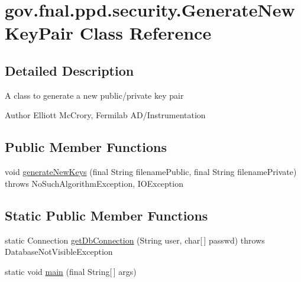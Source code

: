 \hypertarget{classgov_1_1fnal_1_1ppd_1_1security_1_1GenerateNewKeyPair}{\section{gov.\-fnal.\-ppd.\-security.\-Generate\-New\-Key\-Pair Class Reference}
\label{classgov_1_1fnal_1_1ppd_1_1security_1_1GenerateNewKeyPair}
}


\subsection{Detailed Description}
A class to generate a new public/private key pair 

\begin{DoxyAuthor}{Author}
Elliott Mc\-Crory, Fermilab A\-D/\-Instrumentation 
\end{DoxyAuthor}
\subsection*{Public Member Functions}
\begin{DoxyCompactItemize}
\item 
void \hyperlink{classgov_1_1fnal_1_1ppd_1_1security_1_1GenerateNewKeyPair_a8fd10e2d562feed30edd515a65c65935}{generate\-New\-Keys} (final String filename\-Public, final String filename\-Private)  throws No\-Such\-Algorithm\-Exception, I\-O\-Exception 
\end{DoxyCompactItemize}
\subsection*{Static Public Member Functions}
\begin{DoxyCompactItemize}
\item 
static Connection \hyperlink{classgov_1_1fnal_1_1ppd_1_1security_1_1GenerateNewKeyPair_aee008581c8b456ffcdc83a6396e773eb}{get\-Db\-Connection} (String user, char\mbox{[}$\,$\mbox{]} passwd)  throws Database\-Not\-Visible\-Exception 
\item 
static void \hyperlink{classgov_1_1fnal_1_1ppd_1_1security_1_1GenerateNewKeyPair_afe479a0827a3f54f723f59eda57ae050}{main} (final String\mbox{[}$\,$\mbox{]} args)
\end{DoxyCompactItemize}
